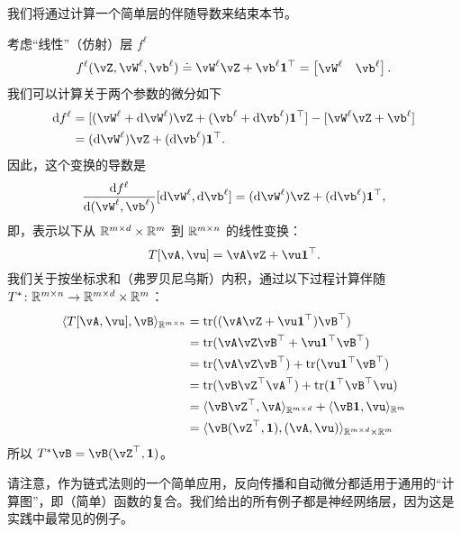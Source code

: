\documentclass[../../book-main_zh.tex]{subfiles}
\begin{document}
我们将通过计算一个简单层的伴随导数来结束本节。
\begin{example}
    考虑“线性”（仿射）层 \(f^{\ell}\)
    \begin{equation}
        f^{\ell}(\vZ, \vW^{\ell}, \vb^{\ell}) \doteq \vW^{\ell}\vZ + \vb^{\ell}\vone^{\top} = \mat{\vW^{\ell} & \vb^{\ell}}.
    \end{equation}
    我们可以计算关于两个参数的微分如下
    \begin{align}
        \odif{f}^{\ell}
        &= [(\vW^{\ell} + \odif{\vW}^{\ell})\vZ + (\vb^{\ell} + \odif{\vb}^{\ell})\vone^{\top}] - [\vW^{\ell}\vZ + \vb^{\ell}] \\ 
        &= (\odif{\vW}^{\ell})\vZ + (\odif{\vb}^{\ell})\vone^{\top}.
    \end{align}
    因此，这个变换的导数是
    \begin{equation}
        \odv{f^{\ell}}{(\vW^{\ell}, \vb^{\ell})}[\odif{\vW}^{\ell}, \odif{\vb}^{\ell}] = (\odif{\vW}^{\ell})\vZ + (\odif{\vb}^{\ell})\vone^{\top},
    \end{equation}
    即，表示以下从 \(\mathbb{R}^{m \times d} \times \mathbb{R}^{m}\) 到 \(\mathbb{R}^{m \times n}\) 的线性变换：
    \begin{equation}
        T[\vA, \vu] = \vA\vZ + \vu\vone^{\top}.
    \end{equation}
    我们关于按坐标求和（弗罗贝尼乌斯）内积，通过以下过程计算伴随 \(T^{*} \colon \mathbb{R}^{m \times n} \to \mathbb{R}^{m \times d} \times \mathbb{R}^{m}\)：
    \begin{align}
        \ip{T[\vA, \vu]}{\vB}_{\R^{m \times n}} 
        &= \tr((\vA\vZ + \vu\vone^{\top})\vB^{\top}) \\
        &= \tr(\vA\vZ\vB^{\top} + \vu\vone^{\top}\vB^{\top}) \\
        &= \tr(\vA\vZ\vB^{\top}) + \tr(\vu\vone^{\top}\vB^{\top}) \\
        &= \tr(\vB\vZ^{\top}\vA^{\top}) + \tr(\vone^{\top}\vB^{\top}\vu) \\
        &= \ip{\vB\vZ^{\top}}{\vA}_{\R^{m \times d}} + \ip{\vB\vone}{\vu}_{\R^{m}} \\
        &= \ip{\vB(\vZ^{\top}, \vone)}{(\vA, \vu)}_{\R^{m \times d} \times \R^{m}}
    \end{align}
    所以 \(T^{*}\vB = \vB(\vZ^{\top}, \vone)\)。
\end{example}

请注意，作为链式法则的一个简单应用，反向传播和自动微分都适用于通用的“计算图”，即（简单）函数的复合。我们给出的所有例子都是神经网络层，因为这是实践中最常见的例子。
\end{document}
